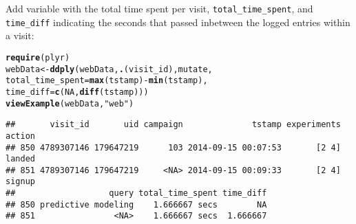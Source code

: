 \documentclass{article}\usepackage[]{graphicx}\usepackage[]{color}
\makeatletter
\newcommand{\hlnum}[1]{\textcolor[rgb]{0.686,0.059,0.569}{#1}}%
\newcommand{\hlstr}[1]{\textcolor[rgb]{0.192,0.494,0.8}{#1}}%
\newcommand{\hlopt}[1]{\textcolor[rgb]{0,0,0}{#1}}%
\newcommand{\hlstd}[1]{\textcolor[rgb]{0.345,0.345,0.345}{#1}}%
\newcommand{\hlkwb}[1]{\textcolor[rgb]{0.69,0.353,0.396}{#1}}%
\newcommand{\hlkwc}[1]{\textcolor[rgb]{0.333,0.667,0.333}{#1}}%
\newcommand{\hlkwd}[1]{\textcolor[rgb]{0.737,0.353,0.396}{\textbf{#1}}}%
\newenvironment{kframe}{%
 \def\at@end@of@kframe{}%
 \ifinner\ifhmode%
  \def\at@end@of@kframe{\end{minipage}}%
  \begin{minipage}{\columnwidth}%
 \fi\fi%
 \def\FrameCommand##1{\hskip\@totalleftmargin \hskip-\fboxsep
 \colorbox{shadecolor}{##1}\hskip-\fboxsep
     \hskip-\linewidth \hskip-\@totalleftmargin \hskip\columnwidth}%
 \MakeFramed {\advance\hsize-\width
   \@totalleftmargin\z@ \linewidth\hsize
   \@setminipage}}%
 {\par\unskip\endMakeFramed%
 \at@end@of@kframe}
\newenvironment{knitrout}{}{} %
\makeatother
\begin{document}
Add variable with the total time spent per visit, \verb+total_time_spent+, and \verb+time_diff+ indicating the seconds that passed inbetween the logged entries within a visit:
\begin{knitrout}
\color{fgcolor}\begin{kframe}
\begin{alltt}
\hlkwd{require}\hlstd{(plyr)}
\hlstd{webData} \hlkwb{<-} \hlkwd{ddply}\hlstd{(webData,} \hlkwd{.}\hlstd{(visit_id), mutate,}
                 \hlkwc{total_time_spent}\hlstd{=}\hlkwd{max}\hlstd{(tstamp)}\hlopt{-}\hlkwd{min}\hlstd{(tstamp),}
                 \hlkwc{time_diff}\hlstd{=}\hlkwd{c}\hlstd{(}\hlnum{NA}\hlstd{,}\hlkwd{diff}\hlstd{(tstamp)))}
\hlkwd{viewExample}\hlstd{(webData,}\hlstr{"web"}\hlstd{)}
\end{alltt}
\begin{verbatim}
##       visit_id       uid campaign              tstamp experiments action
## 850 4789307146 179647219      103 2014-09-15 00:07:53       [2 4] landed
## 851 4789307146 179647219     <NA> 2014-09-15 00:09:33       [2 4] signup
##                   query total_time_spent time_diff
## 850 predictive modeling    1.666667 secs        NA
## 851                <NA>    1.666667 secs  1.666667
\end{verbatim}
\end{kframe}
\end{knitrout}
\end{document}
